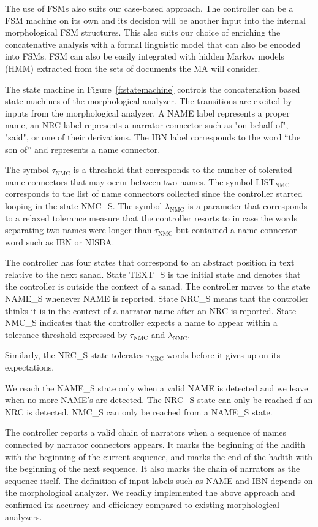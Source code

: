 \documentclass[12pt]{article}
\begin{document}
The use of FSMs also suits our case-based approach. 
The controller can be a FSM machine on its own and its decision
will be another input into the internal morphological FSM structures. 
This also suits our choice of enriching the concatenative analysis
with a formal linguistic model that can also be encoded into FSMs. 
FSM can also be easily integrated with hidden Markov models (HMM)
extracted from the sets of documents the MA will consider. 

The state machine in Figure~\ref{f:statemachine} controls 
the concatenation based state machines of the morphological
analyzer.
The transitions are excited
by inputs from the morphological analyzer. 
A NAME label represents a proper name, 
an NRC label represents a narrator connector such as
 "on behalf of",  "said", 
or one of their derivations. 
The IBN label corresponds to the word  
``the son of'' and represents a name connector.

The symbol $\tau_{\mbox{NMC}}$ is a threshold
that corresponds to the number of tolerated name connectors 
that may occur between two names. 
The symbol LIST$_{\mbox{NMC}}$ corresponds to the list 
of name connectors collected since the controller
started looping in the state NMC\_S. 
The symbol $\lambda_{\mbox{NMC}}$ is a parameter 
that corresponds to a relaxed tolerance measure that
the controller resorts to in case the words separating
two names were longer than $\tau_{\mbox{NMC}}$ but 
contained a name connector word such as IBN or NISBA.

The controller has four states that correspond to 
an abstract position in text relative to the next sanad. 
State TEXT\_S is the initial state and denotes that
the controller is outside the context of a sanad.
The controller moves to the state NAME\_S whenever
NAME is reported.
State NRC\_S means that the controller thinks it is in the context
of a narrator name after an NRC is reported.
State NMC\_S
indicates that the controller expects a name to appear within 
a tolerance threshold expressed by 
$\tau_{\mbox{NMC}}$ and $\lambda_{\mbox{NMC}}$.

Similarly, the NRC\_S state tolerates $\tau_{\mbox{NRC}}$ words 
before it gives up on its expectations. 

We reach the NAME\_S state only when a
valid NAME is detected and we leave when no more NAME's 
are detected. 
The NRC\_S state can only be reached if an NRC is detected.
NMC\_S can only be reached from a NAME\_S state.

The controller reports a valid chain of narrators when a 
sequence of names
connected by narrator connectors appears. 
It marks the beginning of the hadith with the beginning of the 
current sequence,
and marks the end of the hadith with the beginning of the next 
sequence. 
It also marks the chain of narrators as the sequence itself. 
The definition of input labels such as NAME and IBN depends on 
the morphological analyzer. 
We readily implemented the above approach and confirmed its 
accuracy and efficiency compared to existing morphological
analyzers. 
\end{document}
